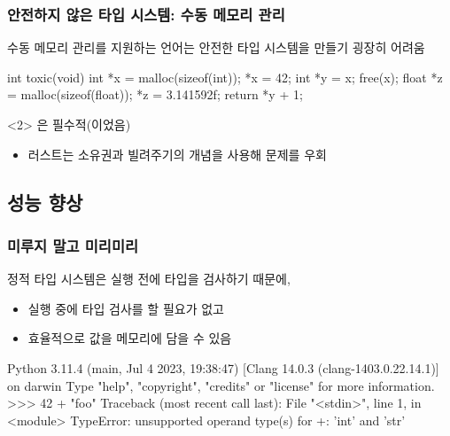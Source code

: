 \documentclass{beamer}
\begin{document}
\begin{frame}[c, fragile]
  \frametitle{안전하지 않은 타입 시스템: 수동 메모리 관리}

  수동 메모리 관리를 지원하는 언어는 안전한 타입 시스템을 만들기 굉장히 어려움

  \begin{ccode}
    int toxic(void)
    {
            int *x = malloc(sizeof(int));
            *x = 42;
            int *y = x;
            free(x);
            float *z = malloc(sizeof(float));
            *z = 3.141592f;
            return *y + 1;
    }
  \end{ccode}

  \begin{onlyenv}<2>
     은 필수적(이었음)
     \begin{itemize}
         \item 러스트는 소유권과 빌려주기의 개념을 사용해 문제를 우회
     \end{itemize}
  \end{onlyenv}
\end{frame}


\subsection{성능 향상}
\begin{frame}[c, fragile]
  \frametitle{미루지 말고 미리미리}

  정적 타입 시스템은 실행 전에 타입을 검사하기 때문에,
  \begin{itemize}
    \item 실행 중에 타입 검사를 할 필요가 없고
    \item 효율적으로 값을 메모리에 담을 수 있음
  \end{itemize}

  \pause\begin{pycode}
Python 3.11.4 (main, Jul  4 2023, 19:38:47) [Clang 14.0.3 (clang-1403.0.22.14.1)] on darwin
Type "help", "copyright", "credits" or "license" for more information.
>>> 42 + "foo"
Traceback (most recent call last):
  File "<stdin>", line 1, in <module>
TypeError: unsupported operand type(s) for +: 'int' and 'str'
  \end{pycode}
\end{frame}
\end{document}

